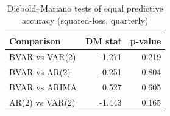 \begin{table}

\caption{\label{tab:dm-tests}Diebold--Mariano tests of equal predictive accuracy (squared-loss, quarterly)}
\centering
\begin{tabular}[t]{lrr}
\toprule
Comparison & DM stat & p-value\\
\midrule
BVAR vs VAR(2) & -1.271 & 0.219\\
BVAR vs AR(2) & -0.251 & 0.804\\
BVAR vs ARIMA & 0.527 & 0.605\\
AR(2) vs VAR(2) & -1.443 & 0.165\\
\bottomrule
\end{tabular}
\end{table}
